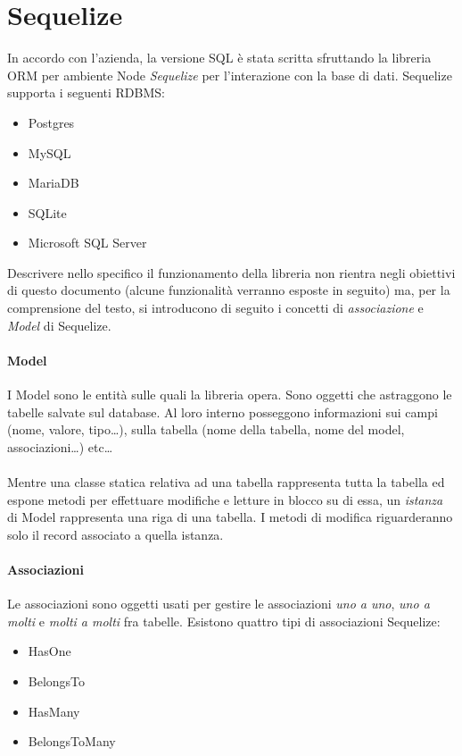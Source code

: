 \documentclass[a4paper, 12pt]{report}
\begin{document}
    \section{Sequelize}
      In accordo con l'azienda, la versione SQL è stata scritta sfruttando la libreria ORM per ambiente Node \emph{Sequelize} per l'interazione con la base di dati.
      Sequelize supporta i seguenti RDBMS:
      \begin{itemize}
        \item Postgres
        \item MySQL
        \item MariaDB
        \item SQLite
        \item Microsoft SQL Server
      \end{itemize}
      Descrivere nello specifico il funzionamento della libreria non rientra negli obiettivi di questo documento (alcune funzionalità verranno esposte in seguito) ma, per la comprensione del testo, si introducono di seguito i concetti di \emph{associazione}  e \emph{Model} di Sequelize.
      \paragraph*{Model} 
      I Model sono le entità sulle quali la libreria opera. Sono oggetti che astraggono le tabelle salvate sul database.
      Al loro interno posseggono informazioni sui campi (nome, valore, tipo\dots), sulla tabella (nome della tabella, nome del model, associazioni\dots) etc\dots
      \paragraph*{}
      Mentre una classe statica relativa ad una tabella rappresenta tutta la tabella ed espone metodi per effettuare modifiche e letture in blocco su di essa, un \emph{istanza} di Model rappresenta una riga di una tabella.
      I metodi di modifica riguarderanno solo il record associato a quella istanza.
      \paragraph*{Associazioni}
      Le associazioni sono oggetti usati per gestire le associazioni \emph{uno a uno}, \emph{uno a molti} e \emph{molti a molti} fra tabelle.
      Esistono quattro tipi di associazioni Sequelize:
      \begin{itemize}
        \item HasOne
        \item BelongsTo
        \item HasMany
        \item BelongsToMany
      \end{itemize}
\end{document}
